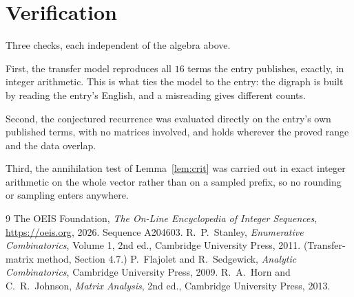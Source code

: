 \documentclass[11pt,a4paper]{article}
\theoremstyle{plain}
\theoremstyle{definition}
\begin{document}
\section{Verification}

Three checks, each independent of the algebra above.

First, the transfer model reproduces all $16$ terms the entry publishes, exactly, in
integer arithmetic. This is what ties the model to the entry: the digraph is built by reading
the entry's English, and a misreading gives different counts.

Second, the conjectured recurrence was evaluated directly on the entry's own published terms,
with no matrices involved, and holds wherever the proved range and the data overlap.

Third, the annihilation test of Lemma~\ref{lem:crit} was carried out in exact integer
arithmetic on the whole vector rather than on a sampled prefix, so no rounding or sampling
enters anywhere.

\begin{thebibliography}{9}
 The OEIS Foundation, \emph{The On-Line Encyclopedia of Integer
Sequences}, \url{https://oeis.org}, 2026. Sequence A204603.
 R.~P.~Stanley, \emph{Enumerative Combinatorics}, Volume 1, 2nd ed.,
Cambridge University Press, 2011. (Transfer-matrix method, Section 4.7.)
 P.~Flajolet and R.~Sedgewick, \emph{Analytic Combinatorics}, Cambridge
University Press, 2009.
 R.~A.~Horn and C.~R.~Johnson, \emph{Matrix Analysis}, 2nd ed., Cambridge
University Press, 2013.
\end{thebibliography}
\end{document}
